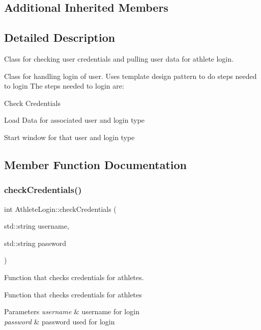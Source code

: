 \subsection*{Additional Inherited Members}


\subsection{Detailed Description}
Class for checking user credentials and pulling user data for athlete login. 

Class for handling login of user. Uses template design pattern to do steps needed to login The steps needed to login are\+:
\begin{DoxyEnumerate}
\item Check Credentials
\item Load Data for associated user and login type
\item Start window for that user and login type 
\end{DoxyEnumerate}

\subsection{Member Function Documentation}
\mbox{\label{classAthleteLogin_a6cd600072b11803af3ca93442c11b7d9}} 
\subsubsection{\texorpdfstring{checkCredentials()}{checkCredentials()}}
{\footnotesize\ttfamily int Athlete\+Login\+::check\+Credentials (\begin{DoxyParamCaption}\item[{std\+::string}]{username,  }\item[{std\+::string}]{password }\end{DoxyParamCaption})\hspace{0.3cm}{\ttfamily [virtual]}}



Function that checks credentials for athletes. 

Function that checks credentials for athletes 
\begin{DoxyParams}{Parameters}
{\em username} & username for login \\
\hline
{\em password} & password used for login \\
\hline
\end{DoxyParams}


